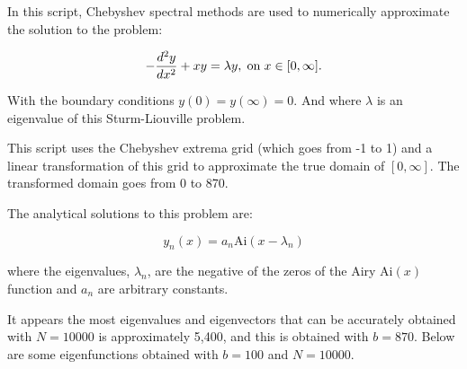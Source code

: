 \documentclass[12pt,a4paper,openright]{article}
\begin{document}
	In this script, Chebyshev spectral methods are used to numerically approximate the solution to the problem:
	
	\[
	- \dfrac{d^2 y}{dx^2} + xy = \lambda y, \hspace{0.1cm}\mathrm{on} \hspace{0.1cm} x\in[0,\infty].
	\]
	
	With the boundary conditions $y(0)=y(\infty)=0$. And where $\lambda$ is an eigenvalue of this Sturm-Liouville problem. 
	
	This script uses the Chebyshev extrema grid (which goes from -1 to 1) and a linear transformation of this grid to approximate the true domain of $[0,\infty]$. The transformed domain goes from 0 to 870. 
		
	The analytical solutions to this problem are:
	
	\[
	y_n(x) = a_n \mathrm{Ai}(x-\lambda_n)
	\]
	
	where the eigenvalues, $\lambda_n$, are the negative of the zeros of the Airy $\mathrm{Ai}(x)$ function and $a_n$ are arbitrary constants. 
	
	It appears the most eigenvalues and eigenvectors that can be accurately obtained with $N=10000$ is approximately 5,400, and this is obtained with $b=870$. Below are some eigenfunctions obtained with $b=100$ and $N=10000$. 
\end{document}
